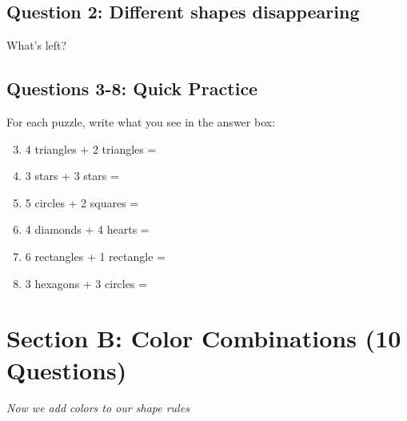 \documentclass{article}
\begin{document}
\subsection*{Question 2: Different shapes disappearing}
\begin{center}
\end{center}
What's left? \underline{\hspace{6cm}}

\subsection*{Questions 3-8: Quick Practice}
For each puzzle, write what you see in the answer box:

\begin{enumerate}
    \setcounter{enumi}{2}
    \item 4 triangles + 2 triangles = \underline{\hspace{3cm}}
    \item 3 stars + 3 stars = \underline{\hspace{3cm}}
    \item 5 circles + 2 squares = \underline{\hspace{3cm}}
    \item 4 diamonds + 4 hearts = \underline{\hspace{3cm}}
    \item 6 rectangles + 1 rectangle = \underline{\hspace{3cm}}
    \item 3 hexagons + 3 circles = \underline{\hspace{3cm}}
\end{enumerate}

\section{Section B: Color Combinations (10 Questions)}
\textit{Now we add colors to our shape rules}
\end{document}
